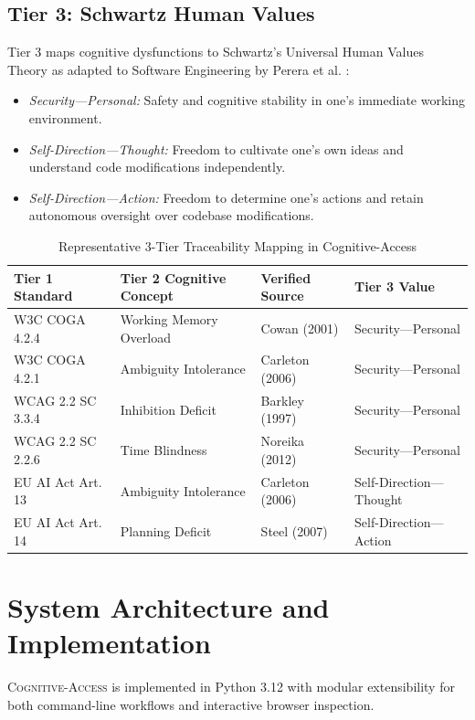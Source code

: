 \documentclass[conference]{IEEEtran}
\begin{document}
\subsection{Tier 3: Schwartz Human Values}
Tier 3 maps cognitive dysfunctions to Schwartz's Universal Human Values Theory as adapted to Software Engineering by Perera et al. \cite{perera2019, schwartz2012}:
\begin{itemize}
    \item \textit{Security---Personal:} Safety and cognitive stability in one's immediate working environment.
    \item \textit{Self-Direction---Thought:} Freedom to cultivate one's own ideas and understand code modifications independently.
    \item \textit{Self-Direction---Action:} Freedom to determine one's actions and retain autonomous oversight over codebase modifications.
\end{itemize}

\begin{table}[t]
\caption{Representative 3-Tier Traceability Mapping in Cognitive-Access}
\label{tab:mapping}
\centering
\scriptsize
\begin{tabular}{p{1.8cm}p{2.3cm}p{1.6cm}p{1.4cm}}
\toprule
\textbf{Tier 1 Standard} & \textbf{Tier 2 Cognitive Concept} & \textbf{Verified Source} & \textbf{Tier 3 Value} \\
\midrule
W3C COGA 4.2.4 & Working Memory Overload & Cowan (2001) & Security---Personal \\
W3C COGA 4.2.1 & Ambiguity Intolerance & Carleton (2006) & Security---Personal \\
WCAG 2.2 SC 3.3.4 & Inhibition Deficit & Barkley (1997) & Security---Personal \\
WCAG 2.2 SC 2.2.6 & Time Blindness & Noreika (2012) & Security---Personal \\
EU AI Act Art. 13 & Ambiguity Intolerance & Carleton (2006) & Self-Direction---Thought \\
EU AI Act Art. 14 & Planning Deficit & Steel (2007) & Self-Direction---Action \\
\bottomrule
\end{tabular}
\end{table}

\section{System Architecture and Implementation}
\textsc{Cognitive-Access} is implemented in Python 3.12 with modular extensibility for both command-line workflows and interactive browser inspection.
\end{document}
